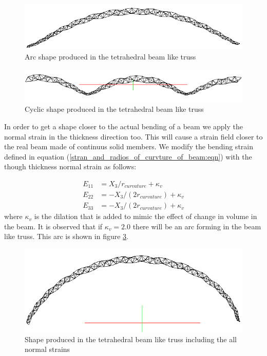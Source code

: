 \begin{figure} 
\centering
\includegraphics[width=5.0in]{./chap_5_active_trusses//images_linear_tetrahedral/tetra_hedral_arc_pi_shape.png}
\caption{Arc shape produced in the tetrahedral beam like truss}
\label{fig:tetra_hedral_arc_pi_shape}
\end{figure}  


\begin{figure} 
\centering
\includegraphics[width=5.0in]{./chap_5_active_trusses//images_linear_tetrahedral/tetra_hedral_arc_2_pi_shape.png}
\caption{Cyclic shape produced in the tetrahedral beam like truss}
\label{fig:tetra_hedral_arc_2_pi_shape}
\end{figure} 

In order to get a shape closer to the actual bending of a beam we apply the normal strain in the thickness direction too.
This will cause a strain field closer to the real beam made of continuus solid members.
We modify the bending strain defined in equation (\ref{stran_and_radios_of_curvture_of_beam:eqn}) with the though thickness normal strain as follows:

\begin{equation}
\begin{aligned}
E_{11}&=X_3/r_{curvature}+\kappa_v \\
E_{22}&=-X_3/(2r_{curvature})+\kappa_v \\
E_{33}&=-X_3/(2r_{curvature})+\kappa_v
\end{aligned}
\label{strain_with_dilation:eqn}
\end{equation}
where $\kappa_v$ is the dilation that is added to mimic the effect of change in volume in the beam.
It is observed that if $\kappa_v=2.0$ there will be an arc forming in the beam like truss.
This arc is shown in figure \ref{fig:tetra_hedral_arc_2_pi_shape_with_pressure}.
\begin{figure} 
\centering
\includegraphics[width=5.0in]{./chap_5_active_trusses//images_linear_tetrahedral/tetra_hedral_arc_2_pi_shape_with_pressure.png}
\caption{Shape produced in the tetrahedral beam like truss including the all normal strains}
\label{fig:tetra_hedral_arc_2_pi_shape_with_pressure}
\end{figure} 

